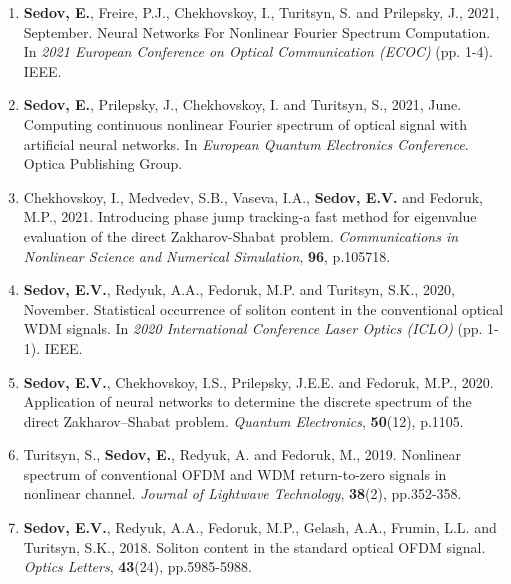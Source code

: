 \begin{enumerate}
    \item \textbf{Sedov, E.}, Freire, P.J., Chekhovskoy, I., Turitsyn, S. and Prilepsky, 
    J., 2021, September. Neural Networks For Nonlinear Fourier Spectrum 
    Computation. In \textit{2021 European Conference on Optical Communication (ECOC)} (pp. 1-4). IEEE.
    \item \textbf{Sedov, E.}, Prilepsky, J., Chekhovskoy, I. and Turitsyn, S., 2021, June. 
    Computing continuous nonlinear Fourier spectrum of optical signal with 
    artificial neural networks. In \textit{European Quantum Electronics Conference}. Optica Publishing Group.
    \item Chekhovskoy, I., Medvedev, S.B., Vaseva, I.A., \textbf{Sedov, E.V.} and Fedoruk, 
    M.P., 2021. Introducing phase jump tracking-a fast method for eigenvalue
    evaluation of the direct Zakharov-Shabat problem. \textit{Communications in Nonlinear Science and Numerical Simulation}, \textbf{96}, p.105718.
    \item \textbf{Sedov, E.V.}, Redyuk, A.A., Fedoruk, M.P. and Turitsyn, S.K., 2020, 
    November. Statistical occurrence of soliton content in the conventional 
    optical WDM signals. In \textit{2020 International Conference Laser Optics (ICLO)} (pp. 1-1). IEEE.
    \item \textbf{Sedov, E.V.}, Chekhovskoy, I.S., Prilepsky, J.E.E. and Fedoruk, M.P., 
    2020. Application of neural networks to determine the discrete spectrum 
    of the direct Zakharov–Shabat problem. \textit{Quantum Electronics}, \textbf{50}(12), p.1105.
    \item Turitsyn, S., \textbf{Sedov, E.}, Redyuk, A. and Fedoruk, M., 2019. Nonlinear 
    spectrum of conventional OFDM and WDM return-to-zero signals in 
    nonlinear channel. \textit{Journal of Lightwave Technology}, \textbf{38}(2), pp.352-358.
    \item \textbf{Sedov, E.V.}, Redyuk, A.A., Fedoruk, M.P., Gelash, A.A., Frumin, L.L. and
    Turitsyn, S.K., 2018. Soliton content in the standard optical OFDM 
    signal. \textit{Optics Letters}, \textbf{43}(24), pp.5985-5988.
\end{enumerate}